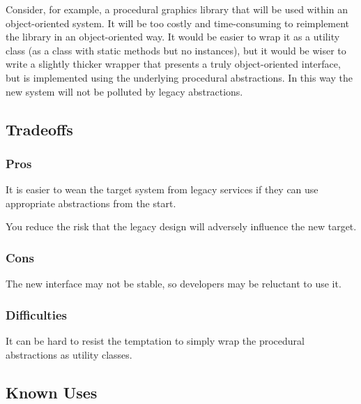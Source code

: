 \documentclass[a4paper,10pt,twoside]{book}
\begin{document}
Consider, for example, a procedural graphics library that will be used within an object-oriented system. It will be too costly and time-consuming to reimplement the library in an object-oriented way. It would be easier to wrap it as a utility class (\ie as a class with static methods but no instances), but it would be wiser to write a slightly thicker wrapper that presents a truly object-oriented interface, but is implemented using the underlying procedural abstractions. In this way the new system will not be polluted by legacy abstractions. 

\subsection*{Tradeoffs}

\subsubsection*{Pros}

\begin{bulletlist}
\item It is easier to wean the target system from legacy services if they can use appropriate abstractions from the start.

\item You reduce the risk that the legacy design will adversely influence the new target.
\end{bulletlist}

\subsubsection*{Cons}

\begin{bulletlist}
\item The new interface may not be stable, so developers may be reluctant to use it.
\end{bulletlist}

\subsubsection*{Difficulties}

\begin{bulletlist}
\item It can be hard to resist the temptation to simply wrap the procedural abstractions as utility classes.
\end{bulletlist}

\subsection*{Known Uses}
\end{document}
